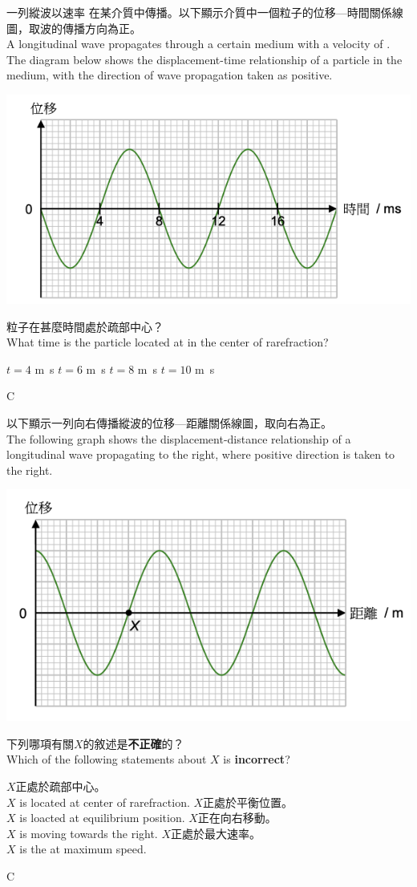 {
    一列縱波以速率 在某介質中傳播。以下顯示介質中一個粒子的位移—時間關係線圖，取波的傳播方向為正。\\A longitudinal wave propagates through a certain medium with a velocity of . The diagram below shows the displacement-time relationship of a particle in the medium, with the direction of wave propagation taken as positive.
    \par{\par\centering\includegraphics[width=.5\textwidth]{./img/ch1_earlyclass_wave_mc_2024-05-13-16-21-19.png}\par}
    粒子在甚麼時間處於疏部中心？\\What time is the particle located at  in the center of rarefraction?
    \begin{tasks}
        \task $t=4$ \unit{m.s}
        \task $t=6$ \unit{m.s}
        \task $t=8$ \unit{m.s}
        \task $t=10$ \unit{m.s}
    \end{tasks}


}{C}

{
    以下顯示一列向右傳播縱波的位移—距離關係線圖，取向右為正。\\The following graph shows the displacement-distance relationship of a longitudinal wave propagating to the right, where positive direction is taken to the right.
    \par{\par\centering\includegraphics[width=.5\textwidth]{./img/ch1_earlyclass_wave_mc_2024-05-13-16-22-56.png}\par}
    下列哪項有關$X$的敘述是\textbf{不正確}的？\\Which of the following statements about $X$ is \textbf{incorrect}?
    \begin{tasks}
        \task $X$正處於疏部中心。\\$X$ is located at center of rarefraction.
            \task $X$正處於平衡位置。\\$X$ is loacted at equilibrium position.
            \task $X$正在向右移動。\\$X$ is moving towards the right.
            \task $X$正處於最大速率。\\$X$ is the at maximum speed.
    \end{tasks}

}{C}